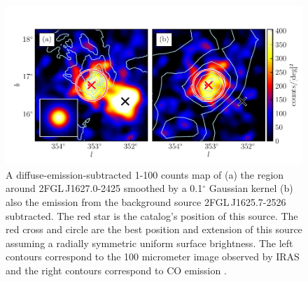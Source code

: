 \documentclass[12pt,preprint]{aastex}
\newcommand{\gev}{\text{GeV}\xspace}
\renewcommand{\deg}{\ensuremath{^\circ}\xspace}
\begin{document}
\begin{figure}
  \begin{center}
    \includegraphics[type=pdf,ext=.pdf,read=.pdf]{source_plots/source_1FGL_J1628.6-2419c}
  \end{center}
  \caption{
  A diffuse-emission-subtracted 1-100 \gev counts
  map of (a) the region around 2FGL\,J1627.0-2425 smoothed by a 0.1\deg
  Gaussian kernel (b) also the emission from the background source 
  2FGL\,J1625.7-2526 subtracted.  The red star is the catalog's
  position of this source.  The red cross and circle are the best
  position and extension of this source assuming a radially symmetric
  uniform surface brightness.  The left contours correspond to the
  100 micrometer image observed by IRAS \citep{iras_rho_ophiuci} and the right
  contours correspond to CO emission \citep{co_rho_ophiuci}.
  }\label{1FGL_J1628.6-2419c}
\end{figure}
\end{document}
